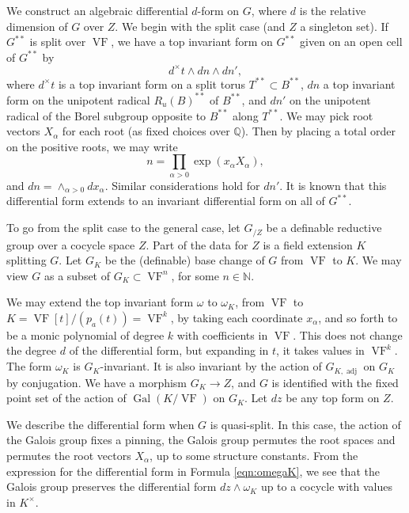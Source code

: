 \documentclass[12pt]{amsart}
\newcommand{\op}[1]{\operatorname{#1}}
\newcommand{\ring}[1]{{\mathbb #1}}
\def\VF{{\op{VF}}}
\theoremstyle{plain}
\theoremstyle{definition}
\begin{document}
We construct an algebraic differential $d$-form on $G$, where $d$ is
the relative dimension of $G$ over $Z$.  We begin with the split case
(and $Z$ a singleton set).  If $G^{**}$ is split over $\op{VF}$, we
have a top invariant form on $G^{**}$ given on an open cell of
$G^{**}$ by
\begin{equation}\label{eqn:omegaK}
d^\times t\land dn\land dn',
\end{equation}
where $d^\times t$ is a top invariant form on a split torus $T^{**} \subset
B^{**}$, $dn$ a top invariant form on the unipotent radical
$R_u(B)^{**}$ of $B^{**}$, and $dn'$ on the unipotent radical of the
Borel subgroup opposite to $B^{**}$ along $T^{**}$.  We may pick root
vectors $X_\alpha$ for each root (as fixed choices over $\ring{Q}$).
Then by placing a total order on the positive roots, we may write
\[
n = \prod_{\alpha>0}\exp(x_\alpha X_\alpha),
\]
and $dn = \land_{\alpha>0} dx_\alpha$.  Similar considerations hold
for $dn'$.  It is known that this differential form extends to an
invariant differential form on all of $G^{**}$.

To go from the split case to the general case, 
let $G_{/Z}$ be a definable reductive group over a cocycle space $Z$.
Part of the data
for $Z$ is a field extension $K$ splitting $G$.  Let $G_K$
be the (definable) base change of $G$ from $\VF$ to $K$. We may view
$G$ as a subset of $G_K\subset \VF^{n}$, for some
$n\in\ring{N}$.

We may extend the top invariant form $\omega$ to $\omega_K$, from
$\VF$ to $K = \VF[t]/(p_a(t)) = \VF^k$, by taking each coordinate
$x_\alpha$, and so forth to be a monic polynomial of degree $k$ with
coefficients in $\VF$.  This does not change the degree $d$ of the
differential form, but expanding in $t$, it takes values in $\VF^k$.
The form $\omega_K$ is $G_K$-invariant.  It is also invariant by the
action of $G_{K,\op{adj}}$ on $G_K$ by conjugation.  We have a
morphism $G_K\to Z$, and $G$ is identified with the fixed point set of
the action of $\op{Gal}(K/\VF)$ on $G_K$.  Let $dz$ be any top form on
$Z$.

We describe the differential form when $G$ is quasi-split.  In this
case, the action of the Galois group fixes a pinning, the Galois group
permutes the root spaces and permutes the root vectors $X_\alpha$, up
to some structure constants.  From the expression for the differential
form in Formula \ref{eqn:omegaK}, we see that the Galois group
preserves the differential form $dz\land \omega_K$ up to a cocycle
with values in $K^\times$.
\end{document}
